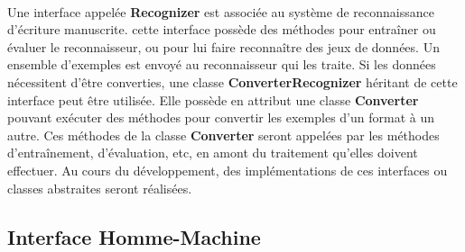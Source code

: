 \paragraph{}
Une interface appelée \textbf{Recognizer} est associée au système de
reconnaissance d’écriture manuscrite. cette interface possède des méthodes
pour entraîner ou évaluer le reconnaisseur, ou pour lui faire reconnaître des
jeux de données. Un ensemble d’exemples est envoyé au reconnaisseur qui les
traite. Si les données nécessitent d’être converties, une classe
\textbf{ConverterRecognizer} héritant de cette interface peut être utilisée.
Elle possède en attribut une classe \textbf{Converter} pouvant exécuter des
méthodes pour convertir les exemples d’un format à un autre. Ces méthodes
de la classe \textbf{Converter} seront appelées par les méthodes
d’entraînement, d’évaluation, etc, en amont du traitement qu’elles doivent
effectuer. Au cours du développement, des implémentations de ces interfaces
ou classes abstraites seront réalisées.

\subsection{Interface Homme-Machine}